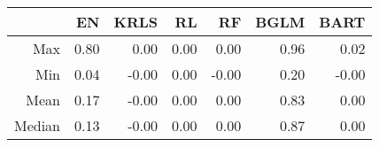 \begin{table}[ht]
\centering
\begin{tabular}{rrrrrrr}
  \hline
 & EN & KRLS & RL & RF & BGLM & BART \\ 
  \hline
Max & 0.80 & 0.00 & 0.00 & 0.00 & 0.96 & 0.02 \\ 
  Min & 0.04 & -0.00 & 0.00 & -0.00 & 0.20 & -0.00 \\ 
  Mean & 0.17 & -0.00 & 0.00 & 0.00 & 0.83 & 0.00 \\ 
  Median & 0.13 & -0.00 & 0.00 & 0.00 & 0.87 & 0.00 \\ 
   \hline
\end{tabular}
\end{table}
